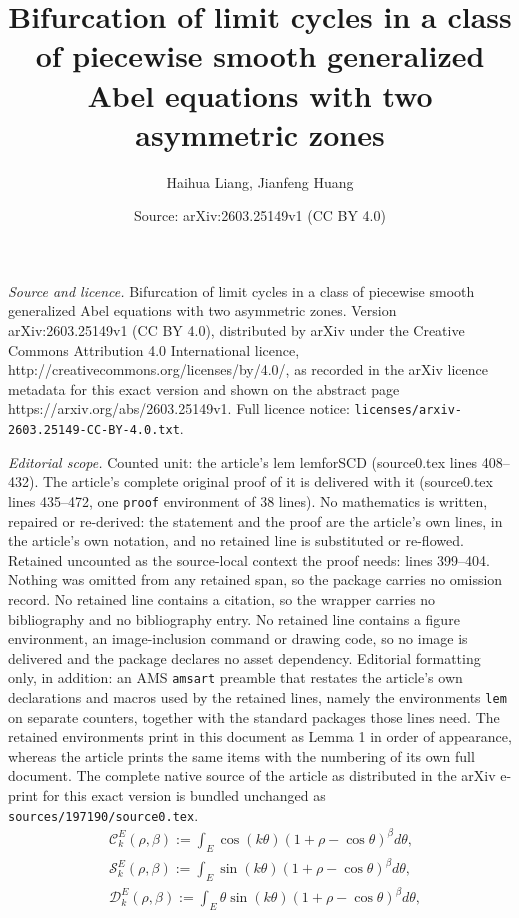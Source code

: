 \documentclass[10pt,a4paper]{amsart}
\title{Bifurcation of limit cycles in a class of piecewise smooth generalized Abel equations with two asymmetric zones}
\author{Haihua Liang, Jianfeng Huang}
\date{Source: arXiv:2603.25149v1 (CC BY 4.0)}
\begin{document}
\maketitle

\noindent\emph{Source and licence.} Bifurcation of limit cycles in a class of piecewise smooth generalized Abel equations with two asymmetric zones. Version arXiv:2603.25149v1 (CC BY 4.0), distributed by arXiv under the Creative Commons Attribution 4.0 International licence, http://creativecommons.org/licenses/by/4.0/, as recorded in the arXiv licence metadata for this exact version and shown on the abstract page https://arxiv.org/abs/2603.25149v1. Full licence notice: \texttt{licenses/arxiv-2603.25149-CC-BY-4.0.txt}.\par\smallskip

\noindent\textit{Editorial scope.} Counted unit: the article's lem lemforSCD (source0.tex lines 408--432). The article's complete original proof of it is delivered with it (source0.tex lines 435--472, one \texttt{proof} environment of 38 lines). No mathematics is written, repaired or re-derived: the statement and the proof are the article's own lines, in the article's own notation, and no retained line is substituted or re-flowed.  Retained uncounted as the source-local context the proof needs: lines 399--404.  Nothing was omitted from any retained span, so the package carries no omission record.  No retained line contains a citation, so the wrapper carries no bibliography and no bibliography entry.  No retained line contains a figure environment, an image-inclusion command or drawing code, so no image is delivered and the package declares no asset dependency.  Editorial formatting only, in addition: an AMS \texttt{amsart} preamble that restates the article's own declarations and macros used by the retained lines, namely the environments \texttt{lem} on separate counters, together with the standard packages those lines need.  The retained environments print in this document as Lemma 1 in order of appearance, whereas the article prints the same items with the numbering of its own full document.  The complete native source of the article as distributed in the arXiv e-print for this exact version is bundled unchanged as \texttt{sources/197190/source0.tex}.
\begin{equation}\label{equa2-1}
\begin{split}
&\mathcal{C}_{k}^{E}(\rho,\beta):=\int_{E}\cos (k\theta)\left(1+\rho-\cos\theta\right)^{\beta}d\theta, \\ &\mathcal{S}_{k}^{E}(\rho,\beta):=\int_{E}\sin (k\theta)\left(1+\rho-\cos\theta\right)^{\beta}d\theta,
\\ &\mathcal{D}_{k}^{E}(\rho,\beta):=\int_{E}\theta\sin (k\theta)\left(1+\rho-\cos\theta\right)^{\beta}d\theta,
\end{split}
\end{equation}
\end{document}
